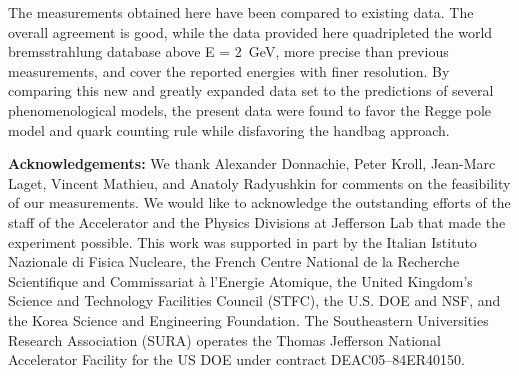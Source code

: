 \documentclass[aps,prc,twocolumn,floatfix,showpacs,preprintnumbers,amsmath,amssymb,superscriptaddress]{revtex4-1}
\begin{document}
The measurements obtained here have been compared to
existing data. The overall agreement is good, while the 
data provided here quadripleted the world bremsstrahlung 
database above E = 2~GeV, more precise than previous 
measurements, and cover the reported energies with finer 
resolution.  By comparing this new and greatly expanded data 
set to the predictions of several phenomenological models, 
the present data were found to favor the Regge pole model 
and quark counting rule while disfavoring the 
handbag approach.  

\textbf{Acknowledgements:}  We thank Alexander Donnachie, 
Peter Kroll, Jean-Marc Laget, Vincent Mathieu, 
and Anatoly Radyushkin for comments on the feasibility of our 
measurements. We would like to acknowledge the outstanding 
efforts of the staff of the Accelerator and the Physics 
Divisions at Jefferson Lab that made the experiment possible.  
This work was supported in part by the Italian Istituto 
Nazionale di Fisica Nucleare, the French Centre National de 
la Recherche Scientifique and Commissariat \`a l'Energie 
Atomique, the United Kingdom's Science and Technology 
Facilities Council (STFC), the U.S. DOE and NSF, and the 
Korea Science and Engineering Foundation. The Southeastern 
Universities Research Association (SURA) operates the Thomas 
Jefferson National Accelerator Facility for the US DOE under 
contract DEAC05--84ER40150.
\end{document}
